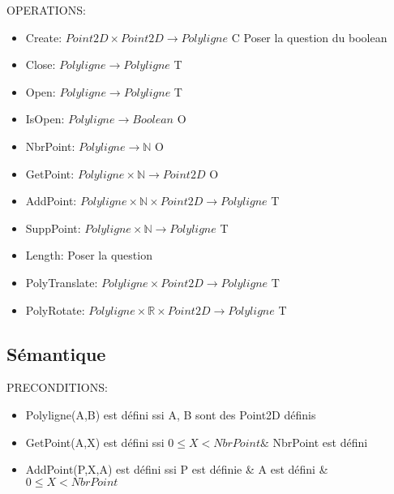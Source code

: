 \documentclass[a4paper, 11pt, oneside]{article}
\begin{document}
\noindent OPERATIONS: 
\begin{itemize}
    \item Create: $Point2D \times Point2D \xrightarrow{} Polyligne$ {\color{green} C} {\color{red} Poser la question du boolean}
    \item Close: $Polyligne \xrightarrow{} Polyligne$ {\color{green} T}
    \item Open: $Polyligne \xrightarrow{} Polyligne$ {\color{green} T}
    \item IsOpen: $Polyligne \xrightarrow{} Boolean$ {\color{green} O}
    \item NbrPoint: $Polyligne \xrightarrow{} \mathbb{N}$ {\color{green} O}
    \item GetPoint: $Polyligne \times \mathbb{N} \xrightarrow{} Point2D$ {\color{green} O}
    \item AddPoint: $Polyligne \times \mathbb{N} \times Point2D \xrightarrow{} Polyligne${\color{green} T}
    \item SuppPoint: $Polyligne \times \mathbb{N} \xrightarrow{} Polyligne$ {\color{green} T}
    \item Length: {\color{red} Poser la question }
    \item PolyTranslate: $Polyligne \times Point2D \xrightarrow{} Polyligne$ {\color{green} T}
    \item PolyRotate: $Polyligne \times \mathbb{R} \times Point2D \xrightarrow{} Polyligne$ {\color{green} T}
\end{itemize}

\subsection{Sémantique}

\noindent PRECONDITIONS:
\begin{itemize}
    \item Polyligne(A,B) est défini ssi A, B sont des Point2D définis
    \item GetPoint(A,X) est défini ssi $0 \leq X < NbrPoint \& $ NbrPoint est défini
    \item AddPoint(P,X,A) est défini ssi P est définie \& A est défini \& $0 \leq X < NbrPoint$
\end{itemize}
\end{document}
